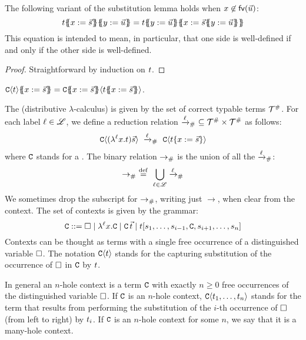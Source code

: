 \begin{lemma}
The following variant of the substitution lemma holds
when $x \not\in \mathsf{fv}({\vec{u}})$:
\[
 \tm\sub{\var}{\ls{\tmtwo}}\sub{\vartwo}{\ls{\tmthree}} =
 \tm\sub{\vartwo}{\ls{\tmthree}}\sub{\var}{\ls{\tmtwo}\sub{\vartwo}{\ls{\tmthree}}}
\]
This equation is intended to mean, in particular, that one side is well-defined
if and only if the other side is well-defined.
\end{lemma}
\begin{proof}
Straightforward by induction on $t$.
\end{proof}

\begin{remark}
$\conof{\tm}\sub{\var}{\ls{\tmtwo}} = \con\sub{\var}{\ls{\tmtwo}}\of{\tm\sub{\var}{\ls{\tmtwo}}}$.
\end{remark}

\bigskip


\begin{definition}
The  (distributive $\lambda$-calculus)
is given by the set of correct typable terms $\mathcal{T}^{\mathtt{\#}}$.
For each label $\ell \in \mathscr{L}$, we define a reduction relation $\mathrel{\xrightarrow{\ell}_{\mathtt{\#}}}\ \subseteq \mathcal{T}^{\mathtt{\#}} \times \mathcal{T}^{\mathtt{\#}}$
as follows:
\[
  \conof{(\lamp{\lab}{\var}{\tm})\vec{\tmtwo}}
  \ \todistl{\lab}\ %
  \conof{\subs{\tm}{\var}{\vec{\tmtwo}}}
\]
where $\mathtt{C}$ stands for a .
The binary relation $\mathrel{\to_{\mathtt{\#}}}$ is the union of all the $\mathrel{\xrightarrow{\ell}_{\mathtt{\#}}}$:
\[
  \mathrel{\to_{\mathtt{\#}}} \ \overset{\mathrm{def}}{=}\ \bigcup_{\ell \in \mathscr{L}}\mathrel{\xrightarrow{\ell}_{\mathtt{\#}}}
\]
We sometimes drop the subscript for $\mathrel{\to_{\mathtt{\#}}}$, writing just $\to$, when clear from the context.
The set of contexts is given by the grammar:
\[
  \mathtt{C} ::= \Box \mid \lambda^{\ell} x. \mathtt{C} \mid \mathtt{C}\,\vec{t} \mid t[s_1,\hdots,s_{i-1},\mathtt{C},s_{i+1},\hdots,s_n]
\]
Contexts can be thought as terms with a single free occurrence of a distinguished variable $\Box$.
The notation $\mathtt{C}\langle t\rangle$ stands for the capturing substitution of the occurrence of $\Box$ in $\mathtt{C}$ by $t$.

In general an $n$-hole context is a term $\mathtt{C}$ with exactly $n \geq 0$ free occurrences of the distinguished variable $\Box$.
If $\mathtt{C}$ is an $n$-hole context, $\mathtt{C}\langle t_1,\hdots,t_n\rangle$ stands for the term
that results from performing the substitution of the $i$-th occurrence of $\Box$ (from left to right)
by $t_i$.
If $\mathtt{C}$ is an $n$-hole context for some $n$, we say that it is a many-hole context.
\end{definition}
